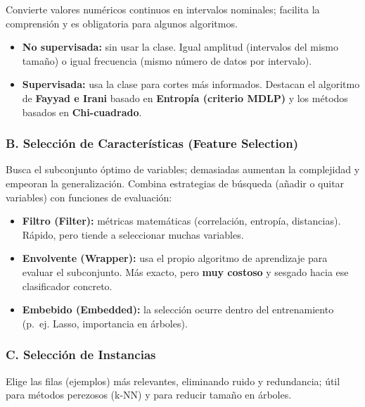 \documentclass[12pt]{book} %
\providecommand{\tightlist}{%
  \setlength{\itemsep}{0pt}\setlength{\parskip}{0pt}}
\begin{document}
Convierte valores numéricos continuos en intervalos nominales; facilita
la comprensión y es obligatoria para algunos algoritmos.

\begin{itemize}
\tightlist
\item
  \textbf{No supervisada:} sin usar la clase. Igual amplitud (intervalos
  del mismo tamaño) o igual frecuencia (mismo número de datos por
  intervalo).
\item
  \textbf{Supervisada:} usa la clase para cortes más informados.
  Destacan el algoritmo de \textbf{Fayyad e Irani} basado en
  \textbf{Entropía (criterio MDLP)} y los métodos basados en
  \textbf{Chi-cuadrado}.
\end{itemize}

\hypertarget{b.-selecciuxf3n-de-caracteruxedsticas-feature-selection}{%
\subsubsection{B. Selección de Características (Feature
Selection)}\label{b.-selecciuxf3n-de-caracteruxedsticas-feature-selection}}

Busca el subconjunto óptimo de variables; demasiadas aumentan la
complejidad y empeoran la generalización. Combina estrategias de
búsqueda (añadir o quitar variables) con funciones de evaluación:

\begin{itemize}
\tightlist
\item
  \textbf{Filtro (Filter):} métricas matemáticas (correlación, entropía,
  distancias). Rápido, pero tiende a seleccionar muchas variables.
\item
  \textbf{Envolvente (Wrapper):} usa el propio algoritmo de aprendizaje
  para evaluar el subconjunto. Más exacto, pero \textbf{muy costoso} y
  sesgado hacia ese clasificador concreto.
\item
  \textbf{Embebido (Embedded):} la selección ocurre dentro del
  entrenamiento (p.~ej. Lasso, importancia en árboles).
\end{itemize}

\hypertarget{c.-selecciuxf3n-de-instancias}{%
\subsubsection{C. Selección de
Instancias}\label{c.-selecciuxf3n-de-instancias}}

Elige las filas (ejemplos) más relevantes, eliminando ruido y
redundancia; útil para métodos perezosos (k-NN) y para reducir tamaño en
árboles.
\end{document}
